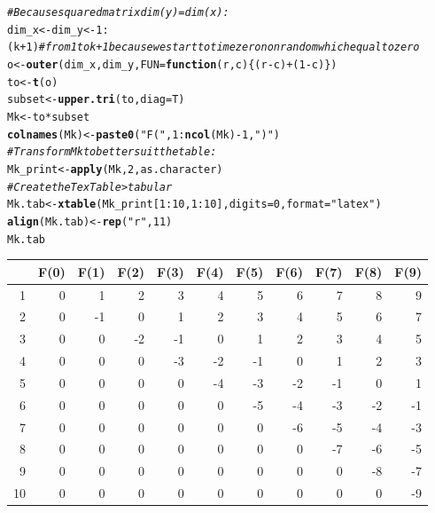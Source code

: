 \documentclass{article}\usepackage[]{graphicx}\usepackage[]{color}
\makeatletter
\newcommand{\hlnum}[1]{\textcolor[rgb]{0.686,0.059,0.569}{#1}}%
\newcommand{\hlstr}[1]{\textcolor[rgb]{0.192,0.494,0.8}{#1}}%
\newcommand{\hlcom}[1]{\textcolor[rgb]{0.678,0.584,0.686}{\textit{#1}}}%
\newcommand{\hlopt}[1]{\textcolor[rgb]{0,0,0}{#1}}%
\newcommand{\hlstd}[1]{\textcolor[rgb]{0.345,0.345,0.345}{#1}}%
\newcommand{\hlkwa}[1]{\textcolor[rgb]{0.161,0.373,0.58}{\textbf{#1}}}%
\newcommand{\hlkwb}[1]{\textcolor[rgb]{0.69,0.353,0.396}{#1}}%
\newcommand{\hlkwc}[1]{\textcolor[rgb]{0.333,0.667,0.333}{#1}}%
\newcommand{\hlkwd}[1]{\textcolor[rgb]{0.737,0.353,0.396}{\textbf{#1}}}%
\newenvironment{kframe}{%
 \def\at@end@of@kframe{}%
 \ifinner\ifhmode%
  \def\at@end@of@kframe{\end{minipage}}%
  \begin{minipage}{\columnwidth}%
 \fi\fi%
 \def\FrameCommand##1{\hskip\@totalleftmargin \hskip-\fboxsep
 \colorbox{shadecolor}{##1}\hskip-\fboxsep
     \hskip-\linewidth \hskip-\@totalleftmargin \hskip\columnwidth}%
 \MakeFramed {\advance\hsize-\width
   \@totalleftmargin\z@ \linewidth\hsize
   \@setminipage}}%
 {\par\unskip\endMakeFramed%
 \at@end@of@kframe}
\makeatother
\begin{document}
\begin{kframe}
\begin{alltt}
\hlcom{# Because squared matrix dim(y) = dim(x):}
\hlstd{dim_x} \hlkwb{<-} \hlstd{dim_y} \hlkwb{<-} \hlnum{1}\hlopt{:}\hlstd{(k} \hlopt{+} \hlnum{1}\hlstd{)} \hlcom{# from 1 to k+1 because we start to time zero nonrandom which equal to zero}
\hlstd{o} \hlkwb{<-} \hlkwd{outer}\hlstd{(dim_x, dim_y,} \hlkwc{FUN}\hlstd{=}\hlkwa{function}\hlstd{(}\hlkwc{r}\hlstd{,}\hlkwc{c}\hlstd{)\{(r}\hlopt{-}\hlstd{c)} \hlopt{+} \hlstd{(}\hlnum{1}\hlopt{-}\hlstd{c)\} )}
\hlstd{to} \hlkwb{<-} \hlkwd{t}\hlstd{(o)}
\hlstd{subset} \hlkwb{<-} \hlkwd{upper.tri}\hlstd{(to,} \hlkwc{diag} \hlstd{= T)}
\hlstd{Mk} \hlkwb{<-} \hlstd{to} \hlopt{*} \hlstd{subset}
\hlkwd{colnames}\hlstd{(Mk)} \hlkwb{<-} \hlkwd{paste0}\hlstd{(}\hlstr{"F("}\hlstd{,} \hlnum{1}\hlopt{:}\hlkwd{ncol}\hlstd{(Mk)} \hlopt{-} \hlnum{1}\hlstd{,} \hlstr{")"}\hlstd{)}
\hlcom{# Transform Mk to better suit the table:}
\hlstd{Mk_print} \hlkwb{<-} \hlkwd{apply}\hlstd{(Mk,} \hlnum{2}\hlstd{, as.character)}
\hlcom{# Create the Tex Table > tabular}
\hlstd{Mk.tab} \hlkwb{<-} \hlkwd{xtable}\hlstd{(Mk_print[}\hlnum{1}\hlopt{:}\hlnum{10}\hlstd{,} \hlnum{1}\hlopt{:}\hlnum{10}\hlstd{],} \hlkwc{digits} \hlstd{=} \hlnum{0}\hlstd{,} \hlkwc{format} \hlstd{=} \hlstr{"latex"}\hlstd{)}
\hlkwd{align}\hlstd{(Mk.tab)} \hlkwb{<-} \hlkwd{rep}\hlstd{(}\hlstr{"r"}\hlstd{,} \hlnum{11}\hlstd{)}
\hlstd{Mk.tab}
\end{alltt}
\end{kframe}%
\begin{table}[ht]
\centering
\begin{tabular}{rrrrrrrrrrr}
  \hline
 & F(0) & F(1) & F(2) & F(3) & F(4) & F(5) & F(6) & F(7) & F(8) & F(9) \\ 
  \hline
1 & 0 & 1 & 2 & 3 & 4 & 5 & 6 & 7 & 8 & 9 \\ 
  2 & 0 & -1 & 0 & 1 & 2 & 3 & 4 & 5 & 6 & 7 \\ 
  3 & 0 & 0 & -2 & -1 & 0 & 1 & 2 & 3 & 4 & 5 \\ 
  4 & 0 & 0 & 0 & -3 & -2 & -1 & 0 & 1 & 2 & 3 \\ 
  5 & 0 & 0 & 0 & 0 & -4 & -3 & -2 & -1 & 0 & 1 \\ 
  6 & 0 & 0 & 0 & 0 & 0 & -5 & -4 & -3 & -2 & -1 \\ 
  7 & 0 & 0 & 0 & 0 & 0 & 0 & -6 & -5 & -4 & -3 \\ 
  8 & 0 & 0 & 0 & 0 & 0 & 0 & 0 & -7 & -6 & -5 \\ 
  9 & 0 & 0 & 0 & 0 & 0 & 0 & 0 & 0 & -8 & -7 \\ 
  10 & 0 & 0 & 0 & 0 & 0 & 0 & 0 & 0 & 0 & -9 \\ 
   \hline
\end{tabular}
\end{table}
\end{document}

